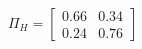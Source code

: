 \documentclass[border=3mm,preview]{standalone}\usepackage{amsmath}
\begin{document}
\[
\Pi_{H}= 
\left[\begin{array}{cc} 
0.66 & 0.34 \\ 
0.24 & 0.76 
\end{array}\right] \] 
\end{document}
